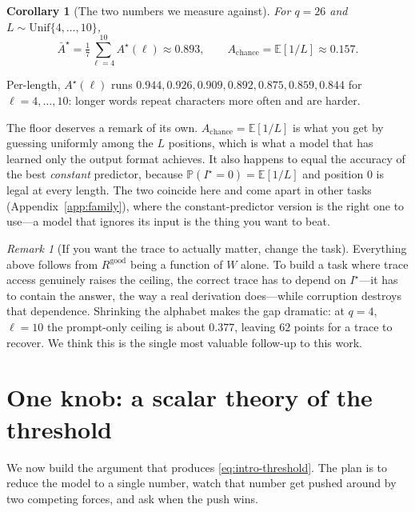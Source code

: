 \documentclass{article}
\theoremstyle{plain}
\newtheorem{corollary}{Corollary}
\theoremstyle{definition}
\theoremstyle{remark}
\newtheorem{remark}{Remark}
\newcommand{\E}{\mathbb{E}}
\newcommand{\Prob}{\mathbb{P}}
\newcommand{\1}{\mathbf{1}}
\newcommand{\good}{\mathrm{good}}
\begin{document}
\begin{corollary}[The two numbers we measure against]
\label{cor:levels}
For $q = 26$ and $L\sim\mathrm{Unif}\{4,\dots,10\}$,
\begin{equation}
\label{eq:levels}
\bar A^\star = \tfrac17\textstyle\sum_{\ell=4}^{10} A^\star(\ell) \approx 0.893,
\qquad
A_{\mathrm{chance}} = \E[1/L] \approx 0.157 .
\end{equation}
\end{corollary}

Per-length, $A^\star(\ell)$ runs $0.944, 0.926, 0.909, 0.892, 0.875, 0.859,
0.844$ for $\ell=4,\dots,10$: longer words repeat characters more often and are
harder.

The floor deserves a remark of its own. $A_{\mathrm{chance}}=\E[1/L]$ is what you
get by guessing uniformly among the $L$ positions, which is what a model that has
learned only the output format achieves. It also happens to equal the accuracy of
the best \emph{constant} predictor, because $\Prob(I^\star=0)=\E[1/L]$ and
position $0$ is legal at every length. The two coincide here and come apart in
other tasks (Appendix~\ref{app:family}), where the constant-predictor version is
the right one to use---a model that ignores its input is the thing you want to
beat.

\begin{remark}[If you want the trace to actually matter, change the task]
\label{rem:gap}
Everything above follows from $R^{\good}$ being a function of $W$ alone. To build
a task where trace access genuinely raises the ceiling, the correct trace has to
depend on $I^\star$---it has to contain the answer, the way a real derivation
does---while corruption destroys that dependence. Shrinking the alphabet makes
the gap dramatic: at $q=4$, $\ell=10$ the prompt-only ceiling is about $0.377$,
leaving $62$ points for a trace to recover. We think this is the single most
valuable follow-up to this work.
\end{remark}

\section{One knob: a scalar theory of the threshold}
\label{sec:scalar}

We now build the argument that produces \eqref{eq:intro-threshold}. The plan is
to reduce the model to a single number, watch that number get pushed around by
two competing forces, and ask when the push wins.
\end{document}
